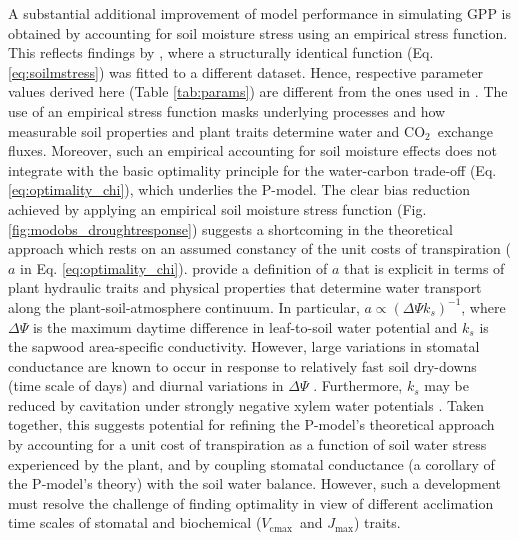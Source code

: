 \documentclass{myreport}
\newcommand{\coo}{CO$_2$}
\newcommand{\vcmax}{$V_{\text{cmax}}$}
\newcommand{\jmax}{$J_{\text{max}}$}
\begin{document}
A substantial additional improvement of model performance in simulating GPP is obtained by accounting for soil moisture stress using an empirical stress function. This reflects findings by \cite{stocker19natgeo}, where a structurally identical function (Eq. \ref{eq:soilmstress}) was fitted to a different dataset. Hence, respective parameter values derived here (Table \ref{tab:params}) are different from the ones used in \cite{stocker19natgeo}. The use of an empirical stress function masks underlying processes and how measurable soil properties and plant traits determine water and \coo\ exchange fluxes. Moreover, such an empirical accounting for soil moisture effects does not integrate with the basic optimality principle for the water-carbon trade-off (Eq. \ref{eq:optimality_chi}), which underlies the P-model. The clear bias reduction achieved by applying an empirical soil moisture stress function (Fig. \ref{fig:modobs_droughtresponse}) suggests a shortcoming in the theoretical approach which rests on an assumed constancy of the unit costs of transpiration ($a$ in Eq. \ref{eq:optimality_chi}). \cite{prentice14ecollett} provide a definition of $a$ that is explicit in terms of plant hydraulic traits and physical properties that determine water transport along the plant-soil-atmosphere continuum. In particular, $a \propto ( \Delta \Psi k_s )^{-1}$, where $\Delta \Psi$ is the maximum daytime difference in leaf-to-soil water potential and $k_s$ is the sapwood area-specific conductivity. However, large variations in stomatal conductance are known to occur in response to relatively fast soil dry-downs (time scale of days) and diurnal variations in $\Delta \Psi$ \citep{keenan10agrformet, egea11, stocker18newphyt}. Furthermore, $k_s$ may be reduced by cavitation under strongly negative xylem water potentials \citep{sperry15, mencuccini19newphyt}. Taken together, this suggests potential for refining the P-model's theoretical approach by accounting for a unit cost of transpiration as a function of soil water stress experienced by the plant, and by coupling stomatal conductance (a corollary of the P-model's theory) with the soil water balance. However, such a development must resolve the challenge of finding optimality in view of different acclimation time scales of stomatal and biochemical (\vcmax\ and \jmax ) traits.
\end{document}
